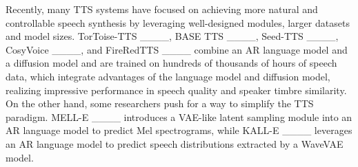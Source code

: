 Recently, many TTS systems have focused on achieving more natural and controllable speech synthesis by leveraging well-designed modules, larger datasets and model sizes. TorToise-TTS ____, BASE TTS ____, Seed-TTS ____, CosyVoice ____, and FireRedTTS ____ combine an AR language model and a diffusion model and are trained on hundreds of thousands of hours of speech data, which integrate advantages of the language model and diffusion model, realizing impressive performance in speech quality and speaker timbre similarity. On the other hand, some researchers push for a way to simplify the TTS paradigm. MELL-E ____ introduces a VAE-like latent sampling module into an AR language model to predict Mel spectrograms, while KALL-E ____ leverages an AR language model to predict speech distributions extracted by a WaveVAE model.




